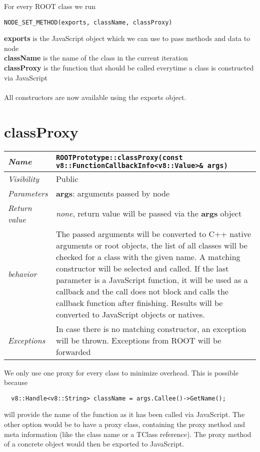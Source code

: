 For every ROOT class we run
\begin{verbatim}
NODE_SET_METHOD(exports, className, classProxy)
\end{verbatim}

\textbf{exports} is the JavaScript object which we can use to pass methods and data to node \\
\textbf{className} is the name of the class in the current iteration\\
\textbf{classProxy} is the function that should be called everytime a class is constructed via JavaScript\\
\\
All constructors are now available using the exports object.
\newpage
\section{classProxy}
\begin{longtable}{p{3cm} @{\hskip 1cm} p{12cm}}
  \hline
  \textit{Name} & \texttt{ROOTPrototype::classProxy(const v8::FunctionCallbackInfo<v8::Value>\& args)} \\
  \hline
  \textit{Visibility} & Public \\
  \hline
  \textit{Parameters} & \textbf{args}: arguments passed by node \\
  \hline
  \textit{Return value} & \textit{none}, return value will be passed via the \textbf{args} object \\
  \hline
  \textit{behavior} & The passed arguments will be converted to C++ native arguments or root objects, the list of all classes will be checked for a class with the given name. A matching constructor will be selected and called.
  If the last parameter is a JavaScript function, it will be used as a callback and the call does not block and calls the callback function after finishing.
  Results will be converted to JavaScript objects or natives. \\
  \hline
  \textit{Exceptions} & In case there is no matching constructor, an exception will be thrown.
  Exceptions from ROOT will be forwarded
  \hline
\end{longtable}
We only use one proxy for every class to minimize overhead. This is possible because
\begin{verbatim}
  v8::Handle<v8::String> className = args.Callee()->GetName();
\end{verbatim}
will provide the name of the function as it has been called via JavaScript.
The other option would be to have a proxy class, containing the proxy method and meta information (like the class name or a TClass reference).
The proxy method of a concrete object would then be exported to JavaScript.


